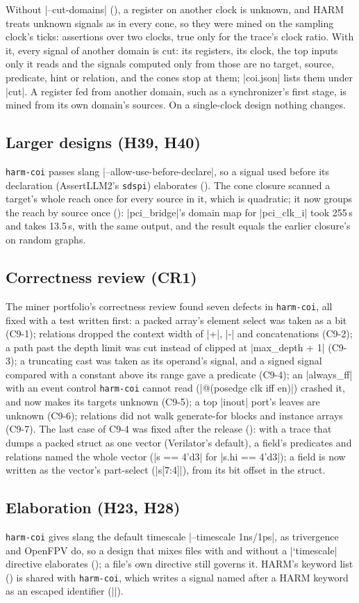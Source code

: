 Without \code|--cut-domains| (), a register on another clock is unknown, and HARM treats unknown signals as in every cone, so they were mined on the sampling clock's ticks: assertions over two clocks, true only for the trace's clock ratio. With it, every signal of another domain is cut: its registers, its clock, the top inputs only it reads and the signals computed only from those are no target, source, predicate, hint or relation, and the cones stop at them; \code|coi.json| lists them under \code|cut|. A register fed from another domain, such as a synchronizer's first stage, is mined from its own domain's sources. On a single-clock design nothing changes.

\subsection{Larger designs (H39, H40)}
\texttt{harm-coi} passes slang \code|--allow-use-before-declare|, so a signal used before its declaration (AssertLLM2's \texttt{sdspi}) elaborates (). The cone closure scanned a target's whole reach once for every source in it, which is quadratic; it now groups the reach by source once (): \code|pci_bridge|'s domain map for \code|pci_clk_i| took 255\,s and takes 13.5\,s, with the same output, and the result equals the earlier closure's on random graphs.

\subsection{Correctness review (CR1)}
The miner portfolio's correctness review found seven defects in \texttt{harm-coi}, all fixed with a test written first: a packed array's element select was taken as a bit (C9-1); relations dropped the context width of \code|+|, \code|-| and concatenations (C9-2); a path past the depth limit was cut instead of clipped at \code|max_depth + 1| (C9-3); a truncating cast was taken as its operand's signal, and a signed signal compared with a constant above its range gave a predicate (C9-4); an \code|always_ff| with an event control \texttt{harm-coi} cannot read (\code|@(posedge clk iff en)|) crashed it, and now makes its targets unknown (C9-5); a top \code|inout| port's leaves are unknown (C9-6); relations did not walk generate-for blocks and instance arrays (C9-7). The last case of C9-4 was fixed after the release (): with a trace that dumps a packed struct as one vector (Verilator's default), a field's predicates and relations named the whole vector (\code|s == 4'd3| for \code|s.hi == 4'd3|); a field is now written as the vector's part-select (\code|s[7:4]|), from its bit offset in the struct.

\subsection{Elaboration (H23, H28)}
\texttt{harm-coi} gives slang the default timescale \code|--timescale 1ns/1ps|, as trivergence and OpenFPV do, so a design that mixes files with and without a \code|`timescale| directive elaborates (); a file's own directive still governs it. HARM's keyword list () is shared with \texttt{harm-coi}, which writes a signal named after a HARM keyword as an escaped identifier (\code|\W |).
